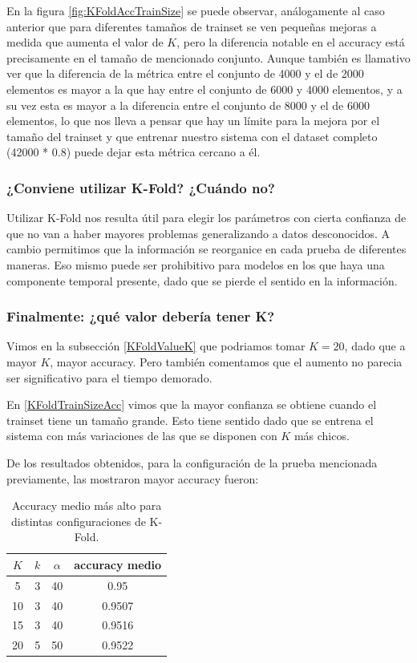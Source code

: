 En la figura \ref{fig:KFoldAccTrainSize} se puede observar, análogamente al caso anterior que para diferentes tamaños de trainset se ven pequeñas mejoras a medida que aumenta el valor de $K$, pero la diferencia notable en el accuracy está precisamente en el tamaño de mencionado conjunto. Aunque también es llamativo ver que la diferencia de la métrica entre el conjunto de 4000 y el de 2000 elementos es mayor a la que hay entre el conjunto de 6000 y 4000 elementos, y a su vez esta es mayor a la diferencia entre el conjunto de 8000 y el de 6000 elementos, lo que nos lleva a pensar que hay un límite para la mejora por el tamaño del trainset y que entrenar nuestro sistema con el dataset completo (42000 * 0.8) puede dejar esta métrica cercano a él.

\subsubsection{¿Conviene utilizar K-Fold? ¿Cuándo no?}

Utilizar K-Fold nos resulta útil para elegir los parámetros con cierta confianza de que no van a haber mayores problemas generalizando a datos desconocidos. A cambio permitimos que la información se reorganice en cada prueba de diferentes maneras. Eso mismo puede ser prohibitivo para modelos en los que haya una componente temporal presente, dado que se pierde el sentido en la información.

\subsubsection{Finalmente: ¿qué valor debería tener K?}

Vimos en la subsección \ref{KFoldValueK} que podriamos tomar $K=20$, dado que a mayor $K$, mayor accuracy. Pero también comentamos que el aumento no parecia ser significativo para el tiempo demorado.

En \ref{KFoldTrainSizeAcc} vimos que la mayor confianza se obtiene cuando el trainset tiene un tamaño grande. Esto tiene sentido dado que se entrena el sistema con más variaciones de las que se disponen con $K$ más chicos.

De los resultados obtenidos, para la configuración de la prueba mencionada previamente, las mostraron mayor accuracy fueron:

\begin{table}[h!]
    \begin{center}
        \begin{tabular}{|c|c|c|c|}
        \hline
        \textbf{$K$} & \textbf{$k$} & \textbf{$\alpha$} & \textbf{accuracy medio} \\
        \hline
        5 & 3 & 40 & 0.95\\
        10 & 3 & 40 & 0.9507\\
        15 & 3 & 40 & 0.9516\\
        20 & 5 & 50 & 0.9522\\
        \hline
        \end{tabular}
        \caption{Accuracy medio más alto para distintas configuraciones de K-Fold.}
        \label{kfold_table_1}
    \end{center}
\end{table}

